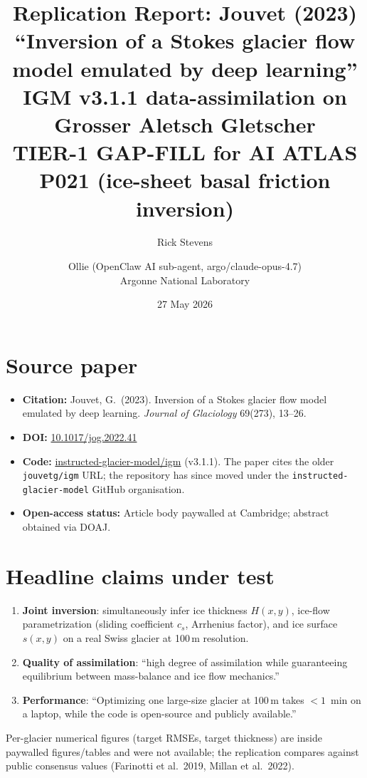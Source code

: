 \documentclass[11pt]{article}
\title{Replication Report: Jouvet (2023) ``Inversion of a Stokes glacier flow model
emulated by deep learning''\\[4pt]
\large IGM v3.1.1 data-assimilation on Grosser Aletsch Gletscher\\
TIER-1 GAP-FILL for AI ATLAS P021 (ice-sheet basal friction inversion)}
\author{Rick Stevens \and Ollie (OpenClaw AI sub-agent, argo/claude-opus-4.7)\\
\small Argonne National Laboratory}
\date{27 May 2026}
\begin{document}
\maketitle

\section{Source paper}
\begin{itemize}
\item \textbf{Citation:} Jouvet, G.\ (2023). Inversion of a Stokes glacier flow model emulated by deep learning. \emph{Journal of Glaciology} 69(273), 13--26.
\item \textbf{DOI:} \href{https://doi.org/10.1017/jog.2022.41}{10.1017/jog.2022.41}
\item \textbf{Code:} \href{https://github.com/instructed-glacier-model/igm}{instructed-glacier-model/igm} (v3.1.1).
The paper cites the older \texttt{jouvetg/igm} URL; the repository has since moved under the
\texttt{instructed-glacier-model} GitHub organisation.
\item \textbf{Open-access status:} Article body paywalled at Cambridge; abstract obtained via DOAJ.
\end{itemize}

\section{Headline claims under test}
\begin{enumerate}
\item \textbf{Joint inversion}: simultaneously infer ice thickness $H(x,y)$,
ice-flow parametrization (sliding coefficient $c_s$, Arrhenius factor),
and ice surface $s(x,y)$ on a real Swiss glacier at 100\,m resolution.
\item \textbf{Quality of assimilation}: ``high degree of assimilation while guaranteeing
equilibrium between mass-balance and ice flow mechanics.''
\item \textbf{Performance}: ``Optimizing one large-size glacier at 100\,m takes
$<\!1$~min on a laptop, while the code is open-source and publicly available.''
\end{enumerate}
Per-glacier numerical figures (target RMSEs, target thickness) are inside paywalled
figures/tables and were not available; the replication compares against public consensus
values (Farinotti et al.\ 2019, Millan et al.\ 2022).
\end{document}

